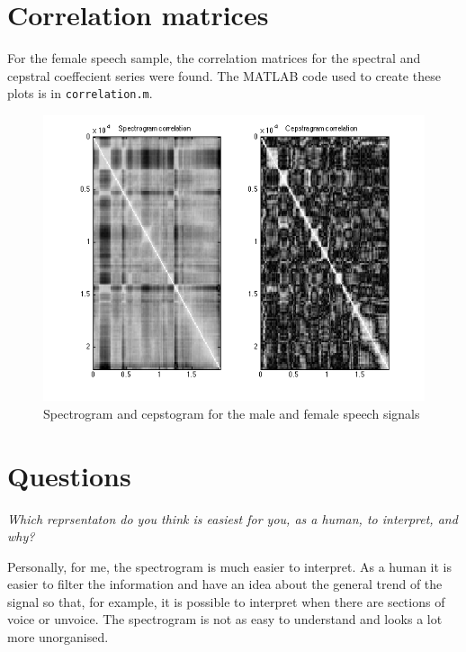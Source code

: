 \documentclass[11pt]{article}   %
\begin{document}
\newpage

\section{Correlation matrices}

For the female speech sample, the correlation matrices for the spectral and cepstral coeffecient series were found. The MATLAB code used to create these plots is in \texttt{correlation.m}.


\begin{figure}[H]
\begin{center}
\leavevmode
\includegraphics[width=1\textwidth]{corr.png}
\end{center}
\caption{Spectrogram and cepstogram for the male and female speech signals}
\label{euler:1}
\end{figure}

\newpage

\section{Questions}
\textit{Which reprsentaton do you think is easiest for you, as a human, to interpret, and why?}\\

\begin{adjustwidth}{2.5em}{0pt}
Personally, for me, the spectrogram is much easier to interpret. As a human it is easier to filter the information and have an idea about the general trend of the signal so that, for example, it is possible to interpret when there are sections of voice or unvoice. The spectrogram is not as easy to understand and looks a lot more unorganised.
\end{adjustwidth}\
\end{document}
